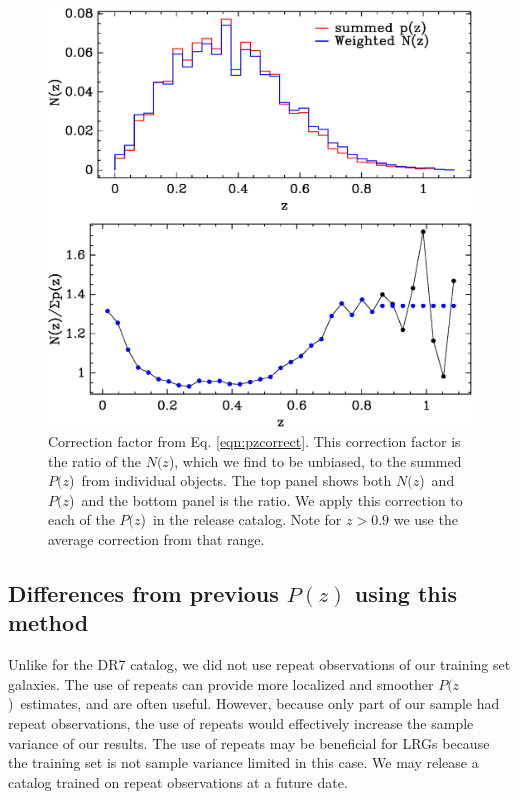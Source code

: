 \documentclass[preprint]{aastex}
\newcommand{\pofz}{$P(z$)}
\newcommand{\nofz}{$N(z$)}
\begin{document}
\begin{figure}[t]\centering
    \includegraphics[scale=0.6]{figures/pofz-correct-12.eps}

    \caption{Correction factor from Eq. \ref{eqn:pzcorrect}.  This correction
    factor is the ratio of the \nofz, which we find to be unbiased, to the summed
    \pofz\ from individual objects. The top panel shows both \nofz\ and \pofz\
    and the bottom panel is the ratio.  We apply this correction to each of the
    \pofz\ in the release catalog.  Note for $z > 0.9$ we use the average
    correction from that range.}

    \label{fig:pzcorr}
    \vspace{2em}
\end{figure}

\subsection{Differences from previous $P(z)$ using this method}

Unlike for the DR7 catalog, we
did not use repeat observations of our training set galaxies.  The use of
repeats can provide more localized and smoother \pofz\ estimates, and are often
useful.  However, because only part of our sample had repeat observations, the
use of repeats would effectively increase the sample variance of our results.
The use of repeats may be beneficial for LRGs because the training set is not
sample variance limited in this case.  We may release a catalog trained on
repeat observations at a future date.  
\end{document}
